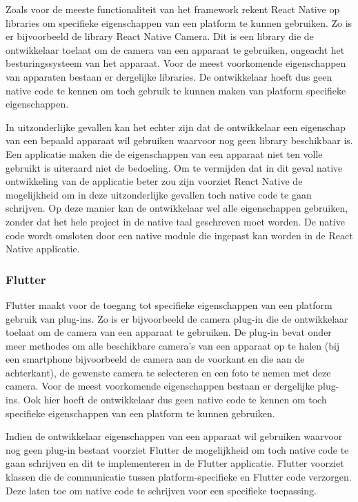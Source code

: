 Zoals voor de meeste functionaliteit van het framework rekent React Native op
libraries om specifieke eigenschappen van een platform te kunnen gebruiken. Zo
is er bijvoorbeeld de library React Native Camera. Dit is een library die de
ontwikkelaar toelaat om de camera van een apparaat te gebruiken, ongeacht het
besturingssysteem van het apparaat. Voor de meest voorkomende eigenschappen van
apparaten bestaan er dergelijke libraries. De ontwikkelaar hoeft dus geen native
code te kennen om toch gebruik te kunnen maken van platform specifieke
eigenschappen.

In uitzonderlijke gevallen kan het echter zijn dat de ontwikkelaar een
eigenschap van een bepaald apparaat wil gebruiken waarvoor nog geen library
beschikbaar is. Een applicatie maken die de eigenschappen van een apparaat niet
ten volle gebruikt is uiteraard niet de bedoeling. Om te vermijden dat in dit
geval native ontwikkeling van de applicatie beter zou zijn voorziet React Native
de mogelijkheid om in deze uitzonderlijke gevallen toch native code te gaan
schrijven. Op deze manier kan de ontwikkelaar wel alle eigenschappen gebruiken,
zonder dat het hele project in de native taal geschreven moet worden. De native code wordt omsloten door een native module die ingepast kan worden in de React Native applicatie.

\subsubsection{Flutter}
\label{subsubsec:nativeAPIFlutter}

Flutter maakt voor de toegang tot specifieke eigenschappen van een platform
gebruik van plug-ins. Zo is er bijvoorbeeld de camera plug-in die de ontwikkelaar
toelaat om de camera van een apparaat te gebruiken. De plug-in bevat onder meer
methodes om alle beschikbare camera's van een apparaat op te halen (bij een
smartphone bijvoorbeeld de camera aan de voorkant en die aan de achterkant), de
gewenste camera te selecteren en een foto te nemen met deze camera. Voor de
meest voorkomende eigenschappen bestaan er dergelijke plug-ins. Ook hier hoeft de
ontwikkelaar dus geen native code te kennen om toch specifieke eigenschappen van
een platform te kunnen gebruiken.

Indien de ontwikkelaar eigenschappen van een apparaat wil gebruiken waarvoor nog geen plug-in bestaat voorziet Flutter de mogelijkheid om toch native code te gaan schrijven en dit te implementeren in de Flutter applicatie. Flutter voorziet klassen die de communicatie tussen platform-specifieke en Flutter code verzorgen. Deze laten toe om native code te schrijven voor een specifieke toepassing.

